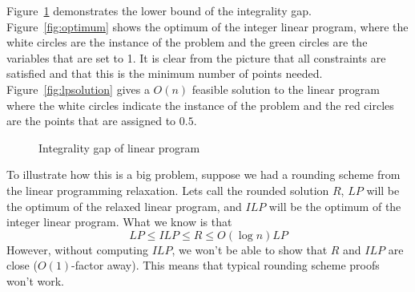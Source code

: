 \documentclass[11pt]{article}
\begin{document}
Figure~\ref{fig:integralitygap} demonstrates the lower bound of the integrality gap. Figure~\ref{fig:optimum} shows the optimum of the integer linear program, where the white circles are the instance of the problem and the green circles are the variables that are set to 1. It is clear from the picture that all constraints are satisfied and that this is the minimum number of points needed. Figure~\ref{fig:lpsolution} gives a $O(n)$ feasible solution to the linear program where the white circles indicate the instance of the problem and the red circles are the points that are assigned to $0.5$. 

\begin{figure}
\centering
{}
\caption{Integrality gap of linear program}
\label{fig:integralitygap}
\end{figure}

To illustrate how this is a big problem, suppose we had a rounding scheme from the linear programming relaxation. Lets call the rounded solution $R$, $LP$ will be the optimum of the relaxed linear program, and $ILP$ will be the optimum of the integer linear program. What we know is that
\[ LP \leq ILP \leq R \leq O(\log n)LP \]
However, without computing $ILP$, we won't be able to show that $R$ and $ILP$ are close ($O(1)$-factor away). This means that typical rounding scheme proofs won't work. 
\end{document}
